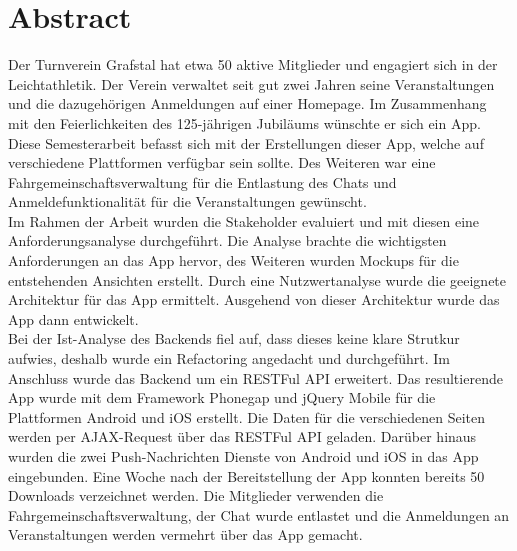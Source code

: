 %
%

\thispagestyle{empty}



\newpage
\thispagestyle{empty}
\chapter*{Abstract}\label{abstract}
Der Turnverein Grafstal hat etwa 50 aktive Mitglieder und engagiert sich in der Leichtathletik. Der Verein verwaltet seit gut zwei Jahren seine Veranstaltungen und die dazugehörigen Anmeldungen auf einer Homepage. Im Zusammenhang mit den Feierlichkeiten des 125-jährigen Jubiläums wünschte er sich ein App.\\

Diese Semesterarbeit befasst sich mit der Erstellungen dieser App, welche auf verschiedene Plattformen verfügbar sein sollte. Des Weiteren war eine Fahrgemeinschaftsverwaltung für die Entlastung des Chats und Anmeldefunktionalität für die Veranstaltungen gewünscht.\\

Im Rahmen der Arbeit wurden die Stakeholder evaluiert und mit diesen eine Anforderungsanalyse durchgeführt. Die Analyse brachte die wichtigsten Anforderungen an das App hervor, des Weiteren wurden Mockups für die entstehenden Ansichten erstellt. Durch eine Nutzwertanalyse wurde die geeignete Architektur für das App ermittelt. Ausgehend von dieser Architektur wurde das App dann entwickelt.\\

Bei der Ist-Analyse des Backends fiel auf, dass dieses keine klare Strutkur aufwies, deshalb wurde ein Refactoring angedacht und durchgeführt. Im Anschluss wurde das Backend um ein RESTFul API erweitert. Das resultierende App wurde mit dem Framework Phonegap und jQuery Mobile für die Plattformen Android und iOS erstellt. Die Daten für die verschiedenen Seiten werden per AJAX-Request über das RESTFul API geladen. Darüber hinaus wurden die zwei Push-Nachrichten Dienste von Android und iOS in das App eingebunden. Eine Woche nach der Bereitstellung der App konnten bereits 50 Downloads verzeichnet werden. Die Mitglieder verwenden die Fahrgemeinschaftsverwaltung, der Chat wurde entlastet und die Anmeldungen an Veranstaltungen werden vermehrt über das App gemacht.

